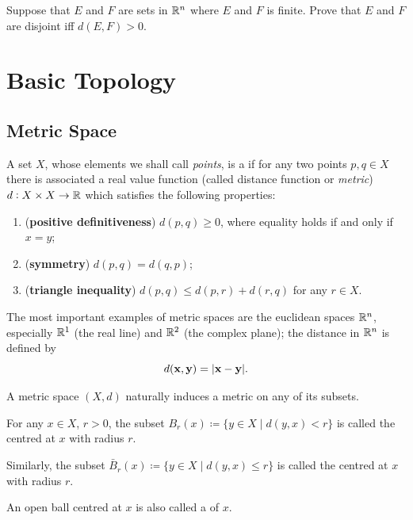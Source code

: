 \begin{exercise}
Suppose that $E$ and $F$ are sets in $\mathbb R^n$ where $E$ and $F$ is finite. Prove that $E$ and $F$ are disjoint iff $d(E,F)>0$.
\end{exercise}

\chapter{Basic Topology}
\section{Metric Space}
\begin{definition}
A set $X$, whose elements we shall call \emph{points}, is a  if for any two points $p,q\in X$ there is associated a real value function (called distance function or \emph{metric}) $d:X\times X\to\mathbb R$ which satisfies the following properties:
\begin{enumerate}[label=(\roman*)]
\item (\textbf{positive definitiveness}) $d(p,q)\ge0$, where equality holds if and only if $x=y$;
\item (\textbf{symmetry}) $d(p,q)=d(q,p)$;
\item (\textbf{triangle inequality}) $d(p,q)\le d(p,r)+d(r,q)$ for any $r\in X$.
\end{enumerate}
\end{definition}

\begin{example}
The most important examples of metric spaces are the euclidean spaces $\mathbb R^n$, especially $\mathbb R^1$ (the real line) and $\mathbb R^2$ (the complex plane); the distance in $\mathbb R^n$ is defined by
\[ d(\vb{x},\vb{y})=|\vb{x}-\vb{y}|. \]
\end{example}

A metric space $(X,d)$ naturally induces a metric on any of its subsets.

\begin{definition}
For any $x\in X$, $r>0$, the subset $B_r(x)\coloneqq\{y\in X\mid d(y,x)<r\}$ is called the  centred at $x$ with radius $r$.

Similarly, the subset $\bar{B}_r(x)\coloneqq\{y\in X\mid d(y,x)\le r\}$ is called the  centred at $x$ with radius $r$.
\end{definition}

An open ball centred at $x$ is also called a  of $x$.

